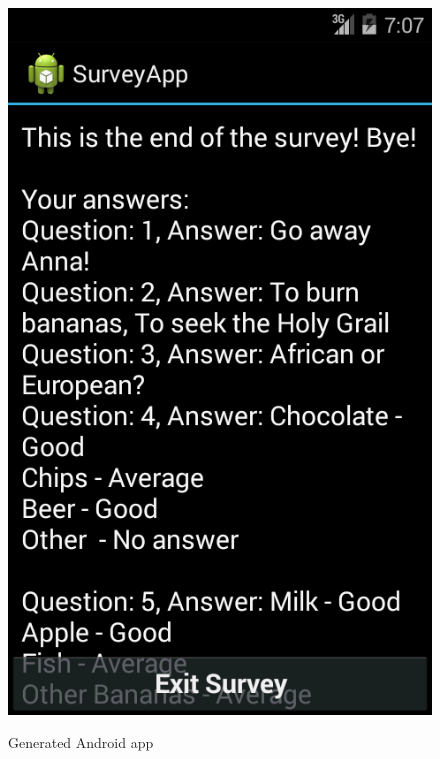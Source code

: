 \documentclass[runningheads,a4paper]{llncs}
\begin{document}
\begin{figure}[htb]
{	\includegraphics[scale=0.22]{images/android/android_7}}
	\caption{Generated Android app}
	\label{fig:android_app}
\end{figure}
\end{document}
